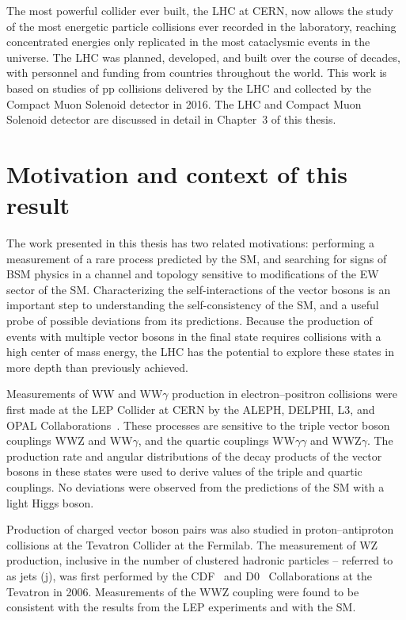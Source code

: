 The most powerful collider ever built, the LHC at CERN,
now allows the study of the most energetic particle collisions ever
recorded in the laboratory, reaching concentrated energies only replicated
in the most cataclysmic events in the universe. The LHC
was planned, developed, and built over the course of decades, with
personnel and funding from countries throughout the world.
This work is based on studies of pp collisions delivered by the LHC 
and collected by the Compact Muon Solenoid detector in 2016.
The LHC and Compact Muon Solenoid detector are discussed in detail 
in Chapter~3 of this thesis.

\section{Motivation and context of this result}
The work presented in this thesis
has two related motivations: performing a measurement of a rare
process predicted by the SM, and searching for signs of 
BSM physics in a channel and topology sensitive to modifications of
the EW sector of the SM.
Characterizing the self-interactions of the vector bosons is an important
step to understanding the self-consistency of the SM, and a useful probe
of possible deviations from its predictions. Because the production of events
with multiple vector bosons in the final state
requires collisions with a high center of mass energy, the LHC has
the potential to explore these states in more depth 
than previously achieved.

Measurements of WW and WW$\gamma$ production in electron--positron collisions
were first made at the LEP
Collider at CERN by the ALEPH, DELPHI, L3, and OPAL Collaborations~\cite{LEP-2}.
These processes are sensitive to the triple vector boson couplings
WWZ and WW$\gamma$, and the quartic couplings WW$\gamma\gamma$
and WWZ$\gamma$. The production rate and angular distributions of the decay
products of the vector bosons in these states were used to derive values 
of the triple and quartic couplings. No deviations were observed from the 
predictions of the SM with a light Higgs boson.

Production of charged vector boson pairs was also studied in proton--antiproton
collisions at the Tevatron Collider at the Fermilab. 
The measurement of WZ production, inclusive in the
number of clustered hadronic particles -- referred to as jets (j), was
first performed by the CDF~\cite{Aaltonen:2012vu,Abulencia:2007tu} 
and D0~\cite{Abazov:2012cj} Collaborations at the Tevatron in 2006. 
Measurements of the WWZ coupling were found to be consistent with the results
from the LEP experiments and with the SM.

